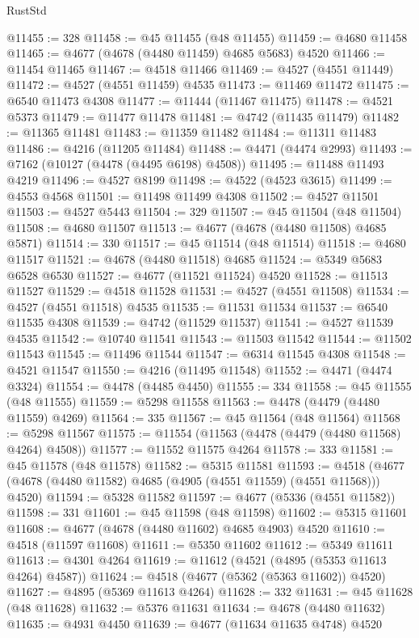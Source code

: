 \begin{lexlean}{RustStd}
\begin{coremodule}
@11455 := 328
@11458 := @45 @11455 (@48 @11455)
@11459 := @4680 @11458
@11465 := @4677 (@4678 (@4480 @11459) @4685 @5683) @4520
@11466 := @11454 @11465
@11467 := @4518 @11466
@11469 := @4527 (@4551 @11449)
@11472 := @4527 (@4551 @11459) @4535
@11473 := @11469 @11472
@11475 := @6540 @11473 @4308
@11477 := @11444 (@11467 @11475)
@11478 := @4521 @5373
@11479 := @11477 @11478
@11481 := @4742 (@11435 @11479)
@11482 := @11365 @11481
@11483 := @11359 @11482
@11484 := @11311 @11483
@11486 := @4216 (@11205 @11484)
@11488 := @4471 (@4474 @2993)
@11493 := @7162 (@10127 (@4478 (@4495 @6198) @4508))
@11495 := @11488 @11493 @4219
@11496 := @4527 @8199
@11498 := @4522 (@4523 @3615)
@11499 := @4553 @4568
@11501 := @11498 @11499 @4308
@11502 := @4527 @11501
@11503 := @4527 @5443
@11504 := 329
@11507 := @45 @11504 (@48 @11504)
@11508 := @4680 @11507
@11513 := @4677 (@4678 (@4480 @11508) @4685 @5871)
@11514 := 330
@11517 := @45 @11514 (@48 @11514)
@11518 := @4680 @11517
@11521 := @4678 (@4480 @11518) @4685
@11524 := @5349 @5683 @6528 @6530
@11527 := @4677 (@11521 @11524) @4520
@11528 := @11513 @11527
@11529 := @4518 @11528
@11531 := @4527 (@4551 @11508)
@11534 := @4527 (@4551 @11518) @4535
@11535 := @11531 @11534
@11537 := @6540 @11535 @4308
@11539 := @4742 (@11529 @11537)
@11541 := @4527 @11539 @4535
@11542 := @10740 @11541
@11543 := @11503 @11542
@11544 := @11502 @11543
@11545 := @11496 @11544
@11547 := @6314 @11545 @4308
@11548 := @4521 @11547
@11550 := @4216 (@11495 @11548)
@11552 := @4471 (@4474 @3324)
@11554 := @4478 (@4485 @4450)
@11555 := 334
@11558 := @45 @11555 (@48 @11555)
@11559 := @5298 @11558
@11563 := @4478 (@4479 (@4480 @11559) @4269)
@11564 := 335
@11567 := @45 @11564 (@48 @11564)
@11568 := @5298 @11567
@11575 := @11554 (@11563 (@4478 (@4479 (@4480 @11568) @4264) @4508))
@11577 := @11552 @11575 @4264
@11578 := 333
@11581 := @45 @11578 (@48 @11578)
@11582 := @5315 @11581
@11593 := @4518 (@4677 (@4678 (@4480 @11582) @4685 (@4905 (@4551 @11559) (@4551 @11568))) @4520)
@11594 := @5328 @11582
@11597 := @4677 (@5336 (@4551 @11582))
@11598 := 331
@11601 := @45 @11598 (@48 @11598)
@11602 := @5315 @11601
@11608 := @4677 (@4678 (@4480 @11602) @4685 @4903) @4520
@11610 := @4518 (@11597 @11608)
@11611 := @5350 @11602
@11612 := @5349 @11611
@11613 := @4301 @4264
@11619 := @11612 (@4521 (@4895 (@5353 @11613 @4264) @4587))
@11624 := @4518 (@4677 (@5362 (@5363 @11602)) @4520)
@11627 := @4895 (@5369 @11613 @4264)
@11628 := 332
@11631 := @45 @11628 (@48 @11628)
@11632 := @5376 @11631
@11634 := @4678 (@4480 @11632)
@11635 := @4931 @4450
@11639 := @4677 (@11634 @11635 @4748) @4520

\end{coremodule}
\end{lexlean}
